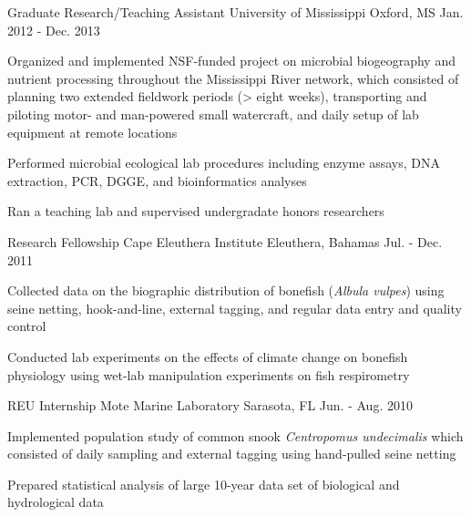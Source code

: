 \begin{cventries}
  \cventry
    {Graduate Research/Teaching Assistant} %
    {University of Mississippi} %
    {Oxford, MS} %
    {Jan. 2012 - Dec. 2013} %
    {
      \begin{cvitems} %
        \item {Organized and implemented NSF-funded project on microbial biogeography and nutrient processing throughout the Mississippi River network, which consisted of planning two extended fieldwork periods (> eight weeks), transporting and piloting motor- and man-powered small watercraft, and daily setup of lab equipment at remote locations}
        \item {Performed microbial ecological lab procedures including enzyme assays, DNA extraction, PCR, DGGE, and bioinformatics analyses}
        \item {Ran a teaching lab and supervised undergradate honors researchers}
      \end{cvitems}
    }
  \cventry
    {Research Fellowship} %
    {Cape Eleuthera Institute} %
    {Eleuthera, Bahamas} %
    {Jul. - Dec. 2011} %
    {
      \begin{cvitems} %
        \item {Collected data on the biographic distribution of bonefish (\textit{Albula vulpes}) using seine netting, hook-and-line, external tagging, and regular data entry and quality control}
        \item {Conducted lab experiments on the effects of climate change on bonefish physiology using wet-lab manipulation experiments on fish respirometry}
      \end{cvitems}
    }
  \cventry
    {REU Internship} %
    {Mote Marine Laboratory} %
    {Sarasota, FL} %
    {Jun. - Aug. 2010} %
    {
      \begin{cvitems} %
        \item {Implemented population study of common snook \textit{Centropomus undecimalis} which consisted of daily sampling and external tagging using hand-pulled seine netting}
        \item {Prepared statistical analysis of large 10-year data set of biological and hydrological data}
      \end{cvitems}
    }
    

\end{cventries}

